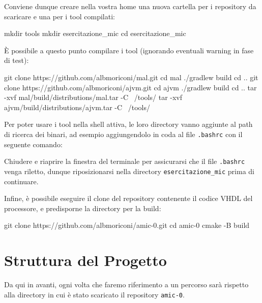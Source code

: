 \documentclass[a4paper,12pt]{scrreprt}
\begin{document}
Conviene dunque creare nella vostra home una nuova cartella per i
repository da scaricare e una per i tool compilati:

\begin{commandshell}
  mkdir tools
  mkdir esercitazione_mic
  cd esercitazione_mic
\end{commandshell}

È possibile a questo punto compilare i tool (ignorando eventuali warning in fase
di test):

\begin{commandshell}
  git clone https://github.com/albmoriconi/mal.git
  cd mal
  ./gradlew build
  cd ..
  git clone https://github.com/albmoriconi/ajvm.git
  cd ajvm
  ./gradlew build
  cd ..
  tar -xvf mal/build/distributions/mal.tar -C ~/tools/
  tar -xvf ajvm/build/distributions/ajvm.tar -C ~/tools/
\end{commandshell}

Per poter usare i tool nella shell attiva, le loro directory vanno aggiunte al
path di ricerca dei binari, ad esempio aggiungendolo in coda al file \lstinline{.bashrc} con il seguente comando:


\begin{mynote}{}{}
  Chiudere e riaprire la finestra del terminale per assicurarsi che il file \lstinline{.bashrc} venga riletto, dunque riposizionarsi nella directory \lstinline{esercitazione_mic} prima di continuare.
\end{mynote}

Infine, è possibile eseguire il clone del repository contenente il codice VHDL
del processore, e predisporne la directory per la build:

\begin{commandshell}
  git clone https://github.com/albmoriconi/amic-0.git
  cd amic-0
  cmake -B build
\end{commandshell}

\section{Struttura del Progetto}

Da qui in avanti, ogni volta che faremo riferimento a un percorso sarà rispetto
alla directory in cui è stato scaricato il repository \lstinline{amic-0}.
\end{document}
